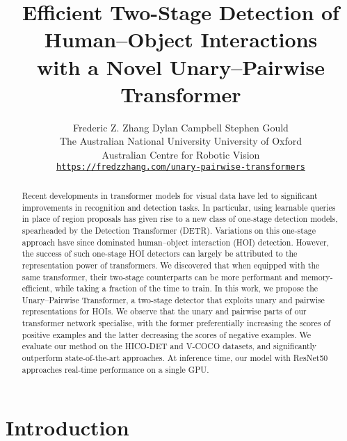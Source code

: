 \documentclass[10pt,twocolumn,letterpaper]{article}
\begin{document}
\title{Efficient Two-Stage Detection of Human--Object Interactions\\with a Novel Unary--Pairwise Transformer}

\author{Frederic Z. Zhang \quad Dylan Campbell \quad Stephen Gould \\
The Australian National University \quad University of Oxford \\ Australian Centre for Robotic Vision\\
{\tt\small \href{https://fredzzhang.com/unary-pairwise-transformers}{https://fredzzhang.com/unary-pairwise-transformers}}
}

\newcommand{\fz}[1]{\comment{FZ}{#1}}
\newcommand{\sg}[1]{\comment{SG}{#1}}
\newcommand{\dc}[1]{\comment{DC}{#1}}

\maketitle

\begin{abstract}
Recent developments in transformer models for visual data have led to significant improvements in recognition and detection tasks. In particular, using learnable queries in place of region proposals has given rise to a new class of one-stage detection models, spearheaded by the Detection Transformer (DETR). Variations on this one-stage approach have since dominated human--object interaction (HOI) detection. However, the success of such one-stage HOI detectors can largely be attributed to the representation power of transformers. We discovered that when equipped with the same transformer, their two-stage counterparts can be more performant and memory-efficient, while taking a fraction of the time to train. In this work, we propose the Unary--Pairwise Transformer, a two-stage detector that exploits unary and pairwise representations for HOIs. We observe that the unary and pairwise parts of our transformer network specialise, with the former preferentially increasing the scores of positive examples and the latter decreasing the scores of negative examples. We evaluate our method on the HICO-DET and V-COCO datasets, and significantly outperform state-of-the-art approaches. At inference time, our model with ResNet50 approaches real-time performance on a single GPU.
\end{abstract}

\section{Introduction}
\end{document}
